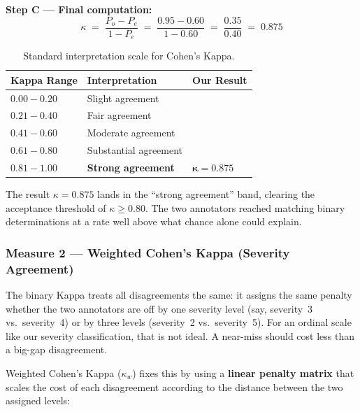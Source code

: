 \documentclass[12pt, a4paper]{report}
\begin{document}
\noindent\textbf{Step C --- Final computation:}
$$\boxed{\;\kappa \;=\; \frac{P_o - P_e}{1 - P_e} \;=\; \frac{0.95 - 0.60}{1 - 0.60} \;=\; \frac{0.35}{0.40} \;=\; 0.875\;}$$

\begin{table}[H]
\centering
\caption{Standard interpretation scale for Cohen's Kappa.}
\label{tab:kappa-scale}
\footnotesize
{}
\begin{tabular}{C{3cm} L{5cm} C{3cm}}
\toprule
{}
\color{white}\textbf{Kappa Range} &
\color{white}\textbf{Interpretation} &
\color{white}\textbf{Our Result} \\
\midrule
$0.00 - 0.20$ & Slight agreement & \\
$0.21 - 0.40$ & Fair agreement & \\
$0.41 - 0.60$ & Moderate agreement & \\
$0.61 - 0.80$ & Substantial agreement & \\
$\mathbf{0.81 - 1.00}$ & \textbf{Strong agreement} & $\boldsymbol{\kappa = 0.875}$ \\
\bottomrule
\end{tabular}
\end{table}

\noindent The result $\kappa = 0.875$ lands in the ``strong agreement'' band, clearing the acceptance threshold of $\kappa \geq 0.80$. The two annotators reached matching binary determinations at a rate well above what chance alone could explain.

\subsubsection{Measure 2 --- Weighted Cohen's Kappa (Severity Agreement)}

The binary Kappa treats all disagreements the same: it assigns the same penalty whether the two annotators are off by one severity level (say, severity~3 vs.~severity~4) or by three levels (severity~2 vs.~severity~5). For an ordinal scale like our severity classification, that is not ideal. A near-miss should cost less than a big-gap disagreement.

Weighted Cohen's Kappa ($\kappa_w$) fixes this by using a \textbf{linear penalty matrix} that scales the cost of each disagreement according to the distance between the two assigned levels:
\end{document}
